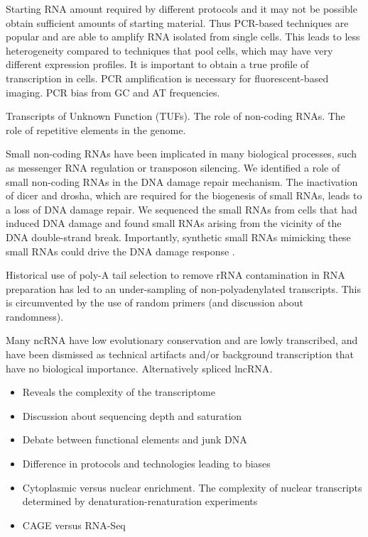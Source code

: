 Starting RNA amount required by different protocols and it may not be possible obtain sufficient amounts of starting material. Thus PCR-based techniques are popular and are able to amplify RNA isolated from single cells. This leads to less heterogeneity compared to techniques that pool cells, which may have very different expression profiles. It is important to obtain a true profile of transcription in cells. PCR amplification is necessary for fluorescent-based imaging. PCR bias from GC and AT frequencies.

Transcripts of Unknown Function (TUFs). The role of non-coding RNAs. The role of repetitive elements in the genome.

Small non-coding RNAs have been implicated in many biological processes, such as messenger RNA regulation or transposon silencing. We identified a role of small non-coding RNAs in the DNA damage repair mechanism. The inactivation of dicer and drosha, which are required for the biogenesis of small RNAs, leads to a loss of DNA damage repair. We sequenced the small RNAs from cells that had induced DNA damage and found small RNAs arising from the vicinity of the DNA double-strand break. Importantly, synthetic small RNAs mimicking these small RNAs could drive the DNA damage response \cite{francia2012site}.

Historical use of poly-A tail selection to remove rRNA contamination in RNA preparation has led to an under-sampling of non-polyadenylated transcripts. This is circumvented by the use of random primers (and discussion about randomness).

Many ncRNA have low evolutionary conservation and are lowly transcribed, and have been dismissed as technical artifacts and/or background transcription that have no biological importance. Alternatively spliced lncRNA\cite{Johnsson2013}.

\begin{itemize}
   \item Reveals the complexity of the transcriptome
   \item Discussion about sequencing depth and saturation
   \item Debate between functional elements and junk DNA
   \item Difference in protocols and technologies leading to biases
   \item Cytoplasmic versus nuclear enrichment. The complexity of nuclear transcripts determined by denaturation-renaturation experiments\cite{pmid5969070}
   \item CAGE versus RNA-Seq
\end{itemize}

